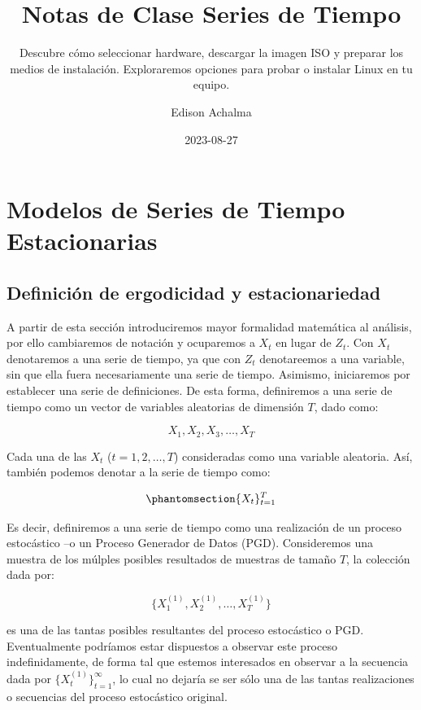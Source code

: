 \documentclass[
  a4paper,
]{article}
\title{Notas de Clase Series de Tiempo}
\subtitle{Descubre cómo seleccionar hardware, descargar la imagen ISO y
preparar los medios de instalación. Exploraremos opciones para probar o
instalar Linux en tu equipo.}
\author{Edison Achalma}
\date{2023-08-27}
\begin{document}
\maketitle

\section{Modelos de Series de Tiempo
Estacionarias}\label{modelos-de-series-de-tiempo-estacionarias}

\subsection{Definición de ergodicidad y
estacionariedad}\label{definiciuxf3n-de-ergodicidad-y-estacionariedad}

A partir de esta sección introduciremos mayor formalidad matemática al
análisis, por ello cambiaremos de notación y ocuparemos a \(X_t\) en
lugar de \(Z_t\). Con \(X_t\) denotaremos a una serie de tiempo, ya que
con \(Z_t\) denotareemos a una variable, sin que ella fuera
necesariamente una serie de tiempo. Asimismo, iniciaremos por establecer
una serie de definiciones. De esta forma, definiremos a una serie de
tiempo como un vector de variables aleatorias de dimensión \(T\), dado
como:

\[
X_1, X_2, X_3, \ldots ,X_T
\]

Cada una de las \(X_t\) (\(t = 1, 2, \ldots, T\)) consideradas como una
variable aleatoria. Así, también podemos denotar a la serie de tiempo
como:

\begin{equation}\phantomsection\label{eq-Serie}{
\{ X_t \}^T_{t = 1}
}\end{equation}

Es decir, definiremos a una serie de tiempo como una realización de un
proceso estocástico --o un Proceso Generador de Datos (PGD).
Consideremos una muestra de los múlples posibles resultados de muestras
de tamaño \(T\), la colección dada por:

\[
\{X^{(1)}_1, X^{(1)}_2, \ldots, X^{(1)}_T\}
\]

es una de las tantas posibles resultantes del proceso estocástico o PGD.
Eventualmente podríamos estar dispuestos a observar este proceso
indefinidamente, de forma tal que estemos interesados en observar a la
secuencia dada por \(\{ X^{(1)}_t \}^{\infty}_{t = 1}\), lo cual no
dejaría se ser sólo una de las tantas realizaciones o secuencias del
proceso estocástico original.
\end{document}
